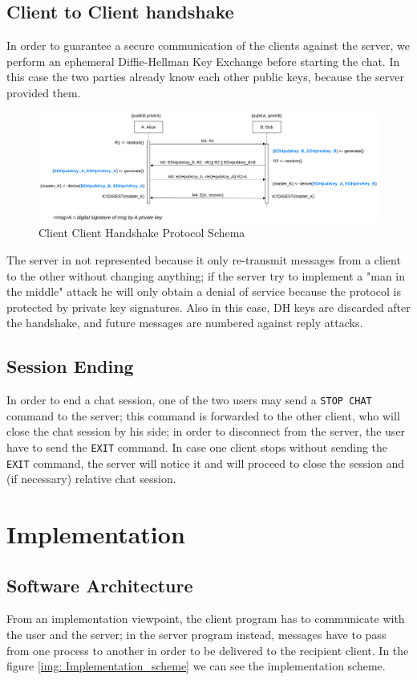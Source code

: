 \documentclass[11pt]{report}
\begin{document}
\section{Client to Client handshake}
In order to guarantee a secure communication of the clients against the server, we perform an ephemeral 
Diffie-Hellman Key Exchange before starting the chat. In this case the two parties already know each other
public keys, because the server provided them. 

\begin{figure}[H]
	\centering
	\includegraphics[scale=0.18]{img/AuthClientClientVer2.png}
	\caption{Client Client Handshake Protocol Schema}
	\label {img: AuthClientClient}
\end{figure}

\noindent The server in not represented because it only re-transmit messages from a client to the other without changing
anything; if the server try to implement a "man in the middle" attack he will only obtain a denial of service
because the protocol is protected by private key signatures. Also in this case, DH keys are discarded after 
the handshake, and future messages are numbered against reply attacks.

\section{Session Ending}
In order to end a chat session, one of the two users may send a \texttt{STOP CHAT} command to the server; this
command is forwarded to the other client, who will close the chat session by his side; in order to disconnect from the server, the user have to send the 
\texttt{EXIT} command. In case one client stops without sending the \texttt{EXIT} command, the server will notice 
it and will proceed to close the session and (if necessary) relative chat session.


\chapter{Implementation}
\section{Software Architecture}
From an implementation viewpoint, the client program has to communicate with the user and the server; in the
server program instead, messages have to pass from one process to another in order to be delivered to the
recipient client. In the figure \ref{img: Implementation_scheme} we can see the implementation scheme.
\end{document}
